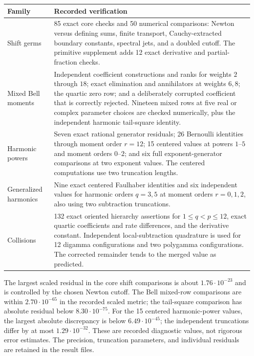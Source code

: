 \begin{longtable}{@{}p{}p{}@{}}
\toprule
Family & Recorded verification\\
\midrule
\endhead
Shift germs & 85 exact core checks and 50 numerical comparisons:
Newton versus defining sums, finite transport, Cauchy-extracted
boundary constants, spectral jets, and a doubled cutoff.
The primitive supplement adds 12 exact derivative and partial-fraction
checks.\\[5pt]
Mixed Bell moments & Independent coefficient constructions and ranks
for weights $2$ through $18$; exact elimination and annihilators at
weights $6,8$; the quartic zero row; and a deliberately corrupted
coefficient that is correctly rejected. Nineteen mixed rows at five
real or complex parameter choices are checked numerically, plus the
independent harmonic tail-square identity.\\[5pt]
Harmonic powers & Seven exact rational generator residuals;
26 Bernoulli identities through moment order $r=12$;
15 centered values at powers $1$--$5$ and moment orders $0$--$2$;
and six full exponent-generator comparisons at two exponent values.
The centered computations use two truncation lengths.\\[5pt]
Generalized harmonics & Nine exact centered Faulhaber identities and
six independent values for harmonic orders $q=3,5$ at moment orders
$r=0,1,2$, also using two subtraction truncations.\\[5pt]
Collisions & 132 exact oriented hierarchy assertions for
$1\le q<p\le12$, exact quartic coefficients and rate differences,
and the derivative constant. Independent local-subtraction quadrature
is used for 12 digamma configurations and two polygamma configurations.
The corrected remainder tends to the merged value as predicted.\\
\bottomrule
\end{longtable}

The largest scaled residual in the core shift comparisons is about
$1.76\cdot10^{-23}$ and is controlled by the chosen Newton cutoff.
The Bell mixed-row comparisons are within
$2.70\cdot10^{-65}$ in the recorded scaled metric; the tail-square
comparison has absolute residual below $8.30\cdot10^{-75}$.
For the 15 centered harmonic-power values, the largest absolute
discrepancy is below $6.49\cdot10^{-45}$; the independent truncations
differ by at most $1.29\cdot10^{-32}$. These are recorded diagnostic
values, not rigorous error estimates. The precision, truncation
parameters, and individual residuals are retained in the result files.

